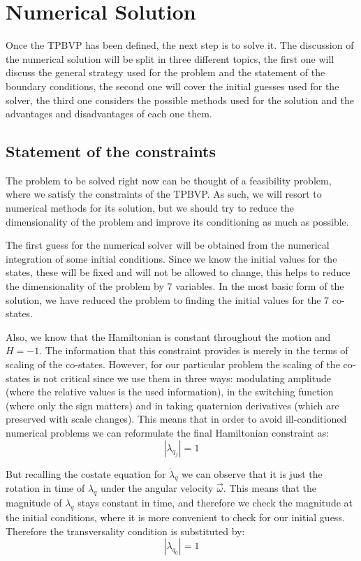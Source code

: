 \section{Numerical Solution}
Once the TPBVP has been defined, the next step is to solve it. The discussion of the numerical solution will be split in three different topics, the first one will discuss the general strategy used for the problem and the statement of the boundary conditions, the second one will cover the initial guesses used for the solver, the third one considers the possible methods used for the solution and the advantages and disadvantages of each one them.

\subsection{Statement of the constraints}
The problem to be solved right now can be thought of a feasibility problem, where we satisfy the constraints of the TPBVP. As such, we will resort to numerical methods for its solution, but we should try to reduce the dimensionality of the problem and improve its conditioning as much as possible.

The first guess for the numerical solver will be obtained from the numerical integration of some initial conditions. Since we know the initial values for the states, these will be fixed and will not be allowed to change, this helps to reduce the dimensionality of the problem by 7 variables. In the most basic form of the solution, we have reduced the problem to finding the initial values for the 7 co-states.

Also, we know that the Hamiltonian is constant throughout the motion and $H=-1$. The information that this constraint provides is merely in the terms of scaling of the co-states. However, for our particular problem the scaling of the co-states is not critical since we use them in three ways: modulating amplitude (where the relative values is the used information), in the switching function (where only the sign matters) and in taking quaternion derivatives (which are preserved with scale changes). This means that in order to avoid ill-conditioned numerical problems we can reformulate the final Hamiltonian constraint as:
\begin{equation}
|\lambda_{q_f}|=1
\end{equation}

But recalling the costate equation for $\dot{\lambda}_q$ we can observe that it is just the rotation in  time of $\lambda_q$ under the angular velocity $\vec{\omega}$. This means that the magnitude of $\lambda_q$ stays constant in time, and therefore we check the magnitude at the initial conditions, where it is more convenient to check for our initial guess. Therefore the transversality condition is substituted by:
\begin{equation}
|\lambda_{q_0}|=1
\end{equation}

